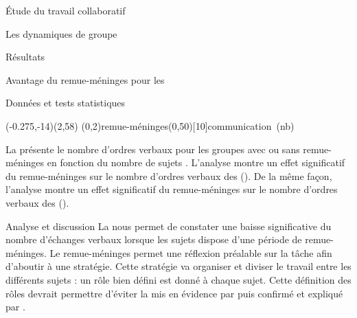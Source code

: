 \documentclass[myfrancais]{mythesis}
\begin{document}
\begin{mypart}{Étude du travail collaboratif}
\begin{mychapter}{Les dynamiques de groupe}
\begin{mysection}{Résultats}
\begin{mysubsection}{Avantage du remue-méninges pour les }
\begin{mysubsubsection}{Données et tests statistiques}
						\begin{myfigure}
							\begin{myps}(-0.275,-14)(2,58)
								\myaxes(0,2){remue-méninges}(0,50)[10]{communication~(nb)}
							\end{myps}
						\end{myfigure}

						La  présente le nombre d'ordres verbaux  pour les groupes avec ou sans remue-méninges  en fonction du nombre de sujets .
						L'analyse montre un effet significatif du remue-méninges  sur le nombre d'ordres verbaux  des  ().
						De la même façon, l'analyse montre un effet significatif du remue-méninges  sur le nombre d'ordres verbaux  des  ().
					\end{mysubsubsection}
					\begin{mysubsubsection}{Analyse et discussion}
						La  nous permet de constater une baisse significative du nombre d'échanges verbaux lorsque les sujets dispose d'une période de remue-méninges.
						Le remue-méninges permet une réflexion préalable sur la tâche afin d'aboutir à une stratégie.
						Cette stratégie va organiser et diviser le travail entre les différents sujets : un rôle bien défini est donné à chaque sujet.
						Cette définition des rôles devrait permettre d'éviter la  mis en évidence par  puis confirmé et expliqué par .


\end{mysubsubsection}
\end{mysubsection}
\end{mysection}
\end{mychapter}
\end{mypart}
\end{document}
